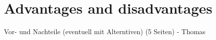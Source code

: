 \section{Advantages and disadvantages}
Vor- und Nachteile (eventuell mit Alterntiven) (5 Seiten) - Thomas
